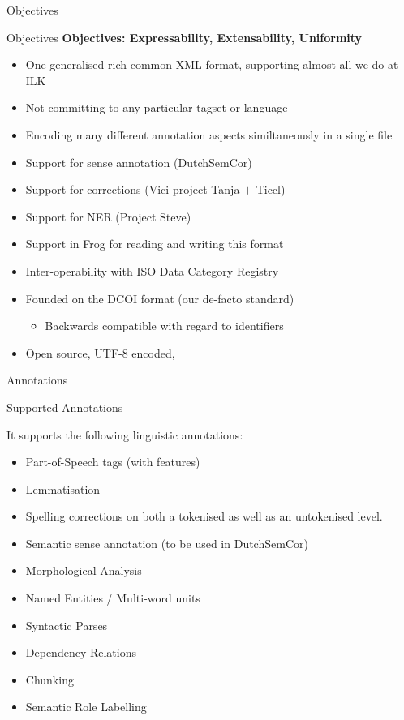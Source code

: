 \documentclass[compress]{beamer}
\begin{document}
\begin{frame}{Objectives}
    \begin{block}{Objectives}
        \textbf{Objectives: Expressability, Extensability, Uniformity}
        \begin{itemize}
            \item One generalised rich common XML format, supporting almost all we do at ILK
            \item Not committing to any particular tagset or language            
            \item Encoding many different annotation aspects similtaneously in a single file
            \item Support for sense annotation (DutchSemCor)
            \item Support for corrections (Vici project Tanja $+$ Ticcl)
            \item Support for NER (Project Steve)
            \item Support in Frog for reading and writing this format
            \item Inter-operability with ISO Data Category Registry
            \item Founded on the DCOI format (our de-facto standard)
            \begin{itemize}
                \item Backwards compatible with regard to identifiers
            \end{itemize}
            \item Open source, UTF-8 encoded,
        \end{itemize}        
    \end{block}
\end{frame}

\begin{frame}{Annotations}
    \begin{block}{Supported Annotations}

    It supports the following linguistic annotations:

    \begin{itemize}
        \item Part-of-Speech tags (with features)
        \item Lemmatisation
        \item Spelling corrections on both a tokenised as well as an untokenised level.
        \item Semantic sense annotation (to be used in DutchSemCor)
        \item Morphological Analysis
        \item Named Entities / Multi-word units
        \item Syntactic Parses
        \item Dependency Relations
        \item Chunking
        \item Semantic Role Labelling
        \end{itemize}

    \end{block}
\end{frame}
\end{document}
